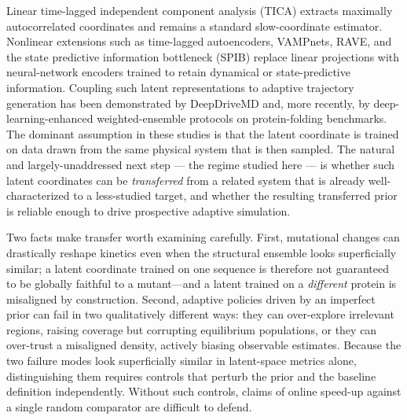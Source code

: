 \documentclass[journal=jctcce,manuscript=article,layout=twocolumn]{achemso}
\begin{document}
Linear time-lagged independent component analysis (TICA) extracts maximally autocorrelated coordinates and remains a standard slow-coordinate estimator.\cite{perezhernandez2013tica,schwantes2013improvements,scherer2015pyemma,noe2017collective} Nonlinear extensions such as time-lagged autoencoders, VAMPnets, RAVE, and the state predictive information bottleneck (SPIB) replace linear projections with neural-network encoders trained to retain dynamical or state-predictive information.\cite{wehmeyer2018time,mardt2018vampnets,ribeiro2018rave,wang2021spib,tishby2000information} Coupling such latent representations to adaptive trajectory generation has been demonstrated by DeepDriveMD\cite{lee2019deepdrivemd} and, more recently, by deep-learning-enhanced weighted-ensemble protocols on protein-folding benchmarks.\cite{leung2025dlwe} The dominant assumption in these studies is that the latent coordinate is trained on data drawn from the same physical system that is then sampled. The natural and largely-unaddressed next step --- the regime studied here --- is whether such latent coordinates can be \emph{transferred} from a related system that is already well-characterized to a less-studied target, and whether the resulting transferred prior is reliable enough to drive prospective adaptive simulation.

Two facts make transfer worth examining carefully. First, mutational changes can drastically reshape kinetics even when the structural ensemble looks superficially similar; a latent coordinate trained on one sequence is therefore not guaranteed to be globally faithful to a mutant---and a latent trained on a \emph{different} protein is misaligned by construction. Second, adaptive policies driven by an imperfect prior can fail in two qualitatively different ways: they can over-explore irrelevant regions, raising coverage but corrupting equilibrium populations, or they can over-trust a misaligned density, actively biasing observable estimates. Because the two failure modes look superficially similar in latent-space metrics alone, distinguishing them requires controls that perturb the prior and the baseline definition independently. Without such controls, claims of online speed-up against a single random comparator are difficult to defend.
\end{document}
